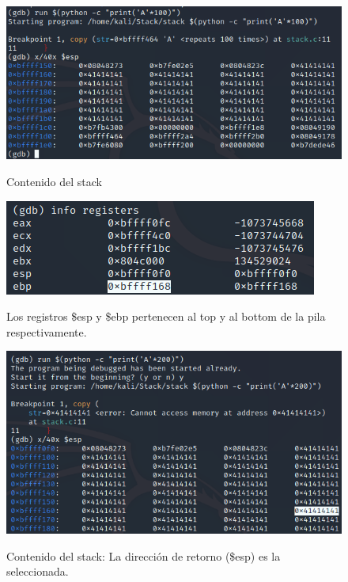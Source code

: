 \documentclass[a4paper,oneside]{article}
\begin{document}
\begin{figure}[h!]
  \centering
  \includegraphics[scale=0.7]{images/stack_content.png}\\
  \caption{Contenido del stack}
  \label{fig:stack_content}
\end{figure}

\begin{figure}[h!]
  \centering
  \includegraphics[scale=0.7]{images/registers.png}\\
  \caption{Los registros \$esp y \$ebp pertenecen al top y al bottom de la pila respectivamente.}
  \label{fig:registers}
\end{figure}

\begin{figure}[h!]
  \centering
  \includegraphics[scale=0.7]{images/overflow.png}\\
  \caption{Contenido del stack: La dirección de retorno (\$esp) es la seleccionada.}
  \label{fig:overflow}
\end{figure}
\end{document}
